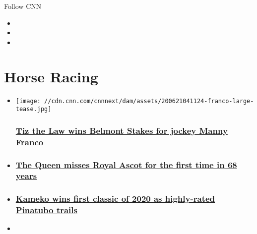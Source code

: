 Follow CNN

\begin{itemize}
\item
\item
\item
\end{itemize}

\hypertarget{horse-racing}{%
\section{Horse Racing}\label{horse-racing}}

\begin{itemize}
\item
  \href{/2020/06/20/us/belmont-stakes-winner-spt-trnd/index.html}{}

  \texttt{[image: //cdn.cnn.com/cnnnext/dam/assets/200621041124-franco-large-tease.jpg]}

  \hypertarget{tiz-the-law-wins-belmont-stakes-for-jockey-manny-franco}{%
  \subsubsection{\texorpdfstring{\href{/2020/06/20/us/belmont-stakes-winner-spt-trnd/index.html}{Tiz
  the Law wins Belmont Stakes for jockey Manny
  Franco}}{Tiz the Law wins Belmont Stakes for jockey Manny Franco}}\label{tiz-the-law-wins-belmont-stakes-for-jockey-manny-franco}}
\item
  \hypertarget{the-queen-misses-royal-ascot-for-the-first-time-in-68-years-}{%
  \subsubsection{\texorpdfstring{\href{/2020/06/16/sport/royal-ascot-the-queen-coronavirus-spt-intl/index.html}{The
  Queen misses Royal Ascot for the first time in 68 years
  }}{The Queen misses Royal Ascot for the first time in 68 years }}\label{the-queen-misses-royal-ascot-for-the-first-time-in-68-years-}}
\item
  \hypertarget{kameko-wins-first-classic-of-2020-as-highly-rated-pinatubo-trails}{%
  \subsubsection{\texorpdfstring{\href{/2020/06/06/sport/2000-guineas-kameko-wins-pinatubo-frankel/index.html}{Kameko
  wins first classic of 2020 as highly-rated Pinatubo
  trails}}{Kameko wins first classic of 2020 as highly-rated Pinatubo trails}}\label{kameko-wins-first-classic-of-2020-as-highly-rated-pinatubo-trails}}
\item
  \hypertarget{welsh-raider-potters-corner-wins-virtual-grand-national-}{%
}
\end{itemize}
